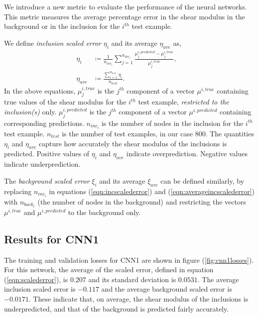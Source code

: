 \documentclass[12pt]{article}
\begin{document}
We introduce a new metric to evaluate the performance of the neural networks. This metric measures the average percentage error in the shear modulus in the background or in the inclusion for the $i^{th}$ test example.

We define \textit{inclusion scaled error} $\eta_{i}$ and its average $\eta_{ave}$ as, 
\begin{subequations}
  \begin{align}
  \eta_{i} &\coloneqq \frac{1}{n_{inc_i}}\sum_{j=1}^{n_{inc_i}}\frac{\mu^{i,predicted}_{j}-\mu^{i,true}_{j}}{\mu^{i,true}_{j}},  &\label{eqn:incscalederror}\\
  \eta_{ave} &\coloneqq \frac{\sum_{i=1}^{n_{test}}\eta_{i}}{n_{test}}. &\label{eqn:averageincscalederror}
  \end{align}
\end{subequations}
In the above equations, $\mu_{j}^{i,true}$ is the $j^{th}$ component of a vector $\mu^{i,true}$ containing true values of the shear modulus for the $i^{th}$ test example, \textit{restricted to the inclusion(s)} only. $\mu_{j}^{i,predicted}$ is the $j^{th}$ component of a vector $\mu^{i,predicted}$ containing corresponding predictions. $n_{inc_i}$ is the number of nodes in the inclusion for the $i^{th}$ test example. $n_{test}$ is the number of test examples, in our case $800$. The quantities $\eta_i$ and $\eta_{ave}$ capture how accurately the shear modulus of the inclusions is predicted. Positive values of $\eta_i$ and $\eta_{ave}$ indicate overprediction. Negative values indicate underprediction.

The \textit{background scaled error} $\xi_{i}$ and its average $\xi_{ave}$ can be defined similarly, by replacing $n_{inc_i}$ in equations (\ref{eqn:incscalederror}) and (\ref{eqn:averageincscalederror})  with $n_{back_i}$ (the number of nodes in the background) and restricting the vectors $\mu^{i,true}$ and $\mu^{i,predicted}$ to the background only.
%
\subsection{\label{sect:resultscnn1}Results for CNN1}
%
The training and validation losses for CNN1 are shown in figure (\ref{fig:cnn1losses}). For this network, the average of the scaled error, defined in equation (\ref{eqn:scalederror}), is $0.207$ and its standard deviation is $0.0531$. The average inclusion scaled error is $-0.117$ and the average background scaled error is $-0.0171$. These indicate that, on average, the shear modulus of the inclusions is underpredicted, and that of the background is predicted fairly accurately.
\end{document}
